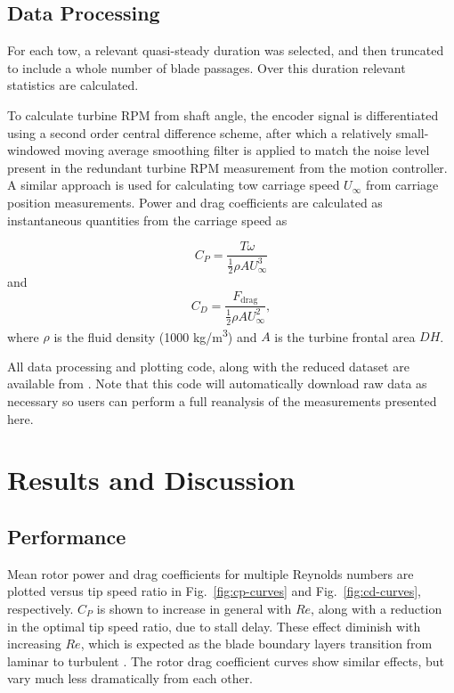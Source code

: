 \documentclass[10pt,letterpaper]{article}
\begin{document}
\subsection*{Data Processing}

For each tow, a relevant quasi-steady duration was selected, and then truncated
to include a whole number of blade passages. Over this duration relevant
statistics are calculated.

To calculate turbine RPM from shaft angle, the encoder signal is differentiated
using a second order central difference scheme, after which a relatively
small-windowed moving average smoothing filter is applied to match the noise
level present in the redundant turbine RPM measurement from the motion
controller. A similar approach is used for calculating tow carriage speed
$U_\infty$ from carriage position measurements. Power and drag coefficients are
calculated as instantaneous quantities from the carriage speed as

\begin{equation}
C_P = \frac{T \omega}{\frac{1}{2} \rho A U_\infty^3}
\end{equation}
and
\begin{equation}
C_D = \frac{F_\mathrm{drag}}{\frac{1}{2} \rho A U_\infty^2},
\end{equation}
where $\rho$ is the fluid density (1000 kg/m\textsuperscript{3}) and $A$ is
the turbine frontal area $DH$. 

All data processing and plotting code, along with the reduced dataset are
available from \cite{Bachant2015-RM2-data}. Note that this code will
automatically download raw data as necessary so users can perform a full
reanalysis of the measurements presented here.

\section*{Results and Discussion}

\subsection*{Performance}

Mean rotor power and drag coefficients for multiple Reynolds numbers are plotted
versus tip speed ratio in Fig.~\ref{fig:cp-curves} and Fig.~\ref{fig:cd-curves},
respectively. $C_P$ is shown to increase in general with $Re$, along with a
reduction in the optimal tip speed ratio, due to stall delay. These effect
diminish with increasing $Re$, which is expected as the blade boundary layers
transition from laminar to turbulent \cite{Lissaman1983,
Bachant2015-RVAT-Re-dep}. The rotor drag coefficient curves show similar
effects, but vary much less dramatically from each other.
\end{document}
